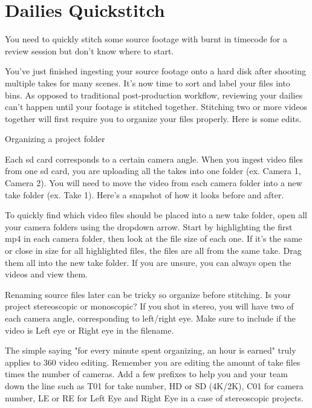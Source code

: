 \chapter{Dailies Quickstitch}
\pagecolor{white}
\label{chap:30}
\begin{fullwidth}

\problem

{\large You need to quickly stitch some source footage with burnt in timecode for a review session but don't know where to start. \par}

You've just finished ingesting your source footage onto a hard disk after shooting multiple takes for many scenes. It's now time to sort and label your files into bins. As opposed to traditional post-production workflow, reviewing your dailies can't happen until your footage is stitched together. Stitching two or more videos together will first require you to organize your files properly. Here is some edits.

\solution

{\large Organizing a project folder \par}

Each sd card corresponds to a certain camera angle. When you ingest video files from one sd card, you are uploading all the takes into one folder (ex. Camera 1, Camera 2). You will need to move the video from each camera folder into a new take folder (ex. Take 1). Here's a snapshot of how it looks before and after.


To quickly find which video files should be placed into a new take folder, open all your camera folders using the dropdown arrow. Start by highlighting the first mp4 in each camera folder, then look at the file size of each one. If it's the same or close in size for all highlighted files, the files are all from the same take. Drag them all into the new take folder. If you are unsure, you can always open the videos and view them.

Renaming source files later can be tricky so organize before stitching. Is your project stereoscopic or monoscopic? If you shot in stereo, you will have two of each camera angle, corresponding to left/right eye. Make sure to include if the video is Left eye or Right eye in the filename.

The simple saying "for every minute spent organizing, an hour is earned" truly applies to 360 video editing. Remember you are editing the amount of take files times the number of cameras. Add a few prefixes to help you and your team down the line such as T01 for take number, HD or SD (4K/2K), C01 for camera number, LE or RE for Left Eye and Right Eye in a case of stereoscopic projects.


\end{fullwidth}
